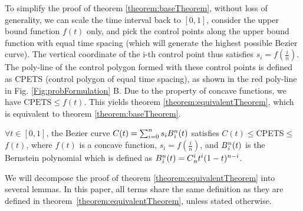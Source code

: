 To simplify the proof of theorem \ref{theorem:baseTheorem}, without loss of generality, we can scale the time interval back to $\left[0, 1\right]$, consider the upper bound function $f(t)$ only, and pick the control points along the upper bound function with equal time spacing (which will generate the highest possible Bezier curve). The vertical coordinate of the i-th control point thus satisfies $s_{i}=f(\frac{i}{n})$. The poly-line of the control polygon formed with these control points is defined as CPETS (control polygon of equal time spacing), as shown in the red poly-line in Fig. \ref{Fig:probFormulation} B. Due to the property of concave functions, we have $\text{CPETS} \leq f(t)$. This yields theorem \ref{theorem:equivalentTheorem}, which is equivalent to theorem \ref{theorem:baseTheorem}.

\begin{theorem}
$\forall t\in\left[0, 1\right]$, the Bezier curve $C(t)=\sum_{i=0}^{n}s_{i}B\textsupsub{$n$}{$i$}(t)$ satisfies $C(t)$$\leq$CPETS$\leq$$f(t)$, where $f(t)$ is a concave function, $s_{i}=f(\frac{i}{n})$, and 
$B\textsupsub{$n$}{$i$}(t)$ is the Bernstein polynomial which is defined as $B\textsupsub{$n$}{$i$}(t)=C\textsupsub{$i$}{$n$}t^{i}(1-t)^{n-i}$.
\label{theorem:equivalentTheorem}
\end{theorem}

We will decompose the proof of theorem \ref{theorem:equivalentTheorem} into several lemmas. In this paper, all terms share the same definition as they are defined in theorem~\ref{theorem:equivalentTheorem}, unless stated otherwise.

